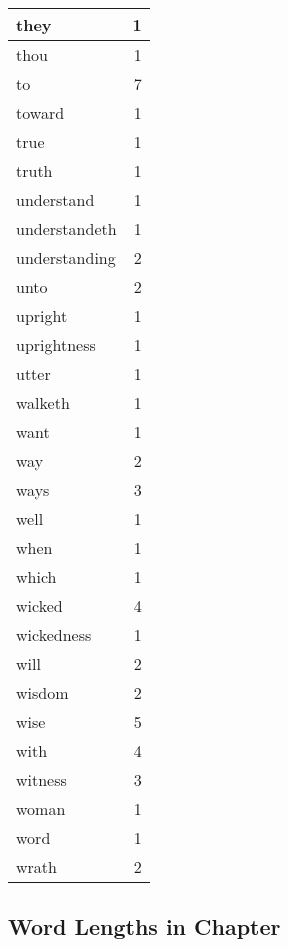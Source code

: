 \begin{center}
\begin{longtable}{l|r}
they & 1\\ \hline 
thou & 1\\ \hline 
to & 7\\ \hline 
toward & 1\\ \hline 
true & 1\\ \hline 
truth & 1\\ \hline 
understand & 1\\ \hline 
understandeth & 1\\ \hline 
understanding & 2\\ \hline 
unto & 2\\ \hline 
upright & 1\\ \hline 
uprightness & 1\\ \hline 
utter & 1\\ \hline 
walketh & 1\\ \hline 
want & 1\\ \hline 
way & 2\\ \hline 
ways & 3\\ \hline 
well & 1\\ \hline 
when & 1\\ \hline 
which & 1\\ \hline 
wicked & 4\\ \hline 
wickedness & 1\\ \hline 
will & 2\\ \hline 
wisdom & 2\\ \hline 
wise & 5\\ \hline 
with & 4\\ \hline 
witness & 3\\ \hline 
woman & 1\\ \hline 
word & 1\\ \hline 
wrath & 2\\ \hline 
\end{longtable}  
\end{center}  


  


  
  
\subsection{Word Lengths in Chapter} 

